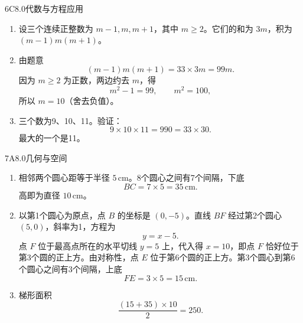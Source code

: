 \begin{solution}{6}{C}{8.0}{代数与方程应用}
\begin{enumerate}[label=\textbf{Step \arabic*:},leftmargin=*]
\item 设三个连续正整数为 \(m-1,m,m+1\)，其中 \(m\ge2\)。它们的和为 \(3m\)，积为 \((m-1)m(m+1)\)。
\item 由题意
\[
  (m-1)m(m+1)=33\times3m=99m.
\]
因为 \(m\ge2\) 为正数，两边约去 \(m\)，得
\[
  m^2-1=99,\qquad m^2=100,
\]
所以 \(m=10\)（舍去负值）。
\item 三个数为9、10、11。验证：
\[
  9\times10\times11=990=33\times30.
\]
最大的一个是11。
\end{enumerate}
\end{solution}

\begin{solution}{7}{A}{8.0}{几何与空间}
\begin{enumerate}[label=\textbf{Step \arabic*:},leftmargin=*]
\item 相邻两个圆心距等于半径 \(5\,\mathrm{cm}\)。8个圆心之间有7个间隔，下底
\[
  BC=7\times5=35\,\mathrm{cm}.
\]
高即为直径 \(10\,\mathrm{cm}\)。
\item 以第1个圆心为原点，点 \(B\) 的坐标是 \((0,-5)\)。直线 \(BF\) 经过第2个圆心 \((5,0)\)，斜率为1，方程为
\[
  y=x-5.
\]
点 \(F\) 位于最高点所在的水平切线 \(y=5\) 上，代入得 \(x=10\)，即点 \(F\) 恰好位于第3个圆的正上方。由对称性，点 \(E\) 位于第6个圆的正上方。第3个圆心到第6个圆心之间有3个间隔，上底
\[
  FE=3\times5=15\,\mathrm{cm}.
\]
\item 梯形面积
\[
  \frac{(15+35)\times10}{2}=250.
\]
\end{enumerate}
\end{solution}


